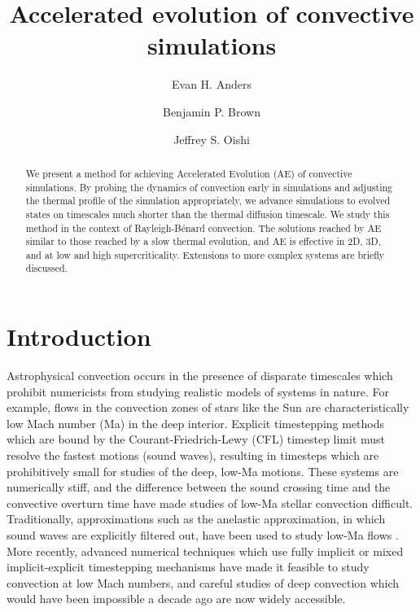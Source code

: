 \documentclass[aps, pre, onecolumn, nofootinbib, notitlepage, groupedaddress, amsfonts, amssymb, amsmath, longbibliography]{revtex4-1}
\newcommand{\RB}{Rayleigh-B\'{e}nard }
\begin{document}
\author{Evan H. Anders}
\author{Benjamin P. Brown}
\author{Jeffrey S. Oishi}
\title{Accelerated evolution of convective simulations}

\begin{abstract}
We present a method for achieving Accelerated Evolution (AE) of convective simulations.
By probing the dynamics of convection early in simulations and adjusting the
thermal profile of the simulation appropriately, we advance simulations to
evolved states on timescales much shorter than the thermal diffusion timescale.
We study this method in the context of \RB convection. 
The solutions reached by AE similar to those reached by a slow thermal evolution, 
and AE is effective in 2D, 3D, and at low and high supercriticality.  
Extensions to more complex systems are briefly discussed.
\end{abstract}
\maketitle


\section{Introduction}
\label{sec:intro}
Astrophysical convection occurs in the presence of disparate timescales which
prohibit numericists from studying realistic models of systems in nature.  For example,
flows in the convection zones of stars like the Sun are characteristically low Mach number
(Ma) in the deep interior.
Explicit timestepping methods which are bound by the Courant-Friedrich-Lewy
(CFL) timestep limit must resolve the fastest motions (sound
waves), resulting in timesteps which are prohibitively
small for studies of the deep, low-Ma motions. These systems are numerically
stiff, and the difference between
the sound crossing time and the convective overturn time have made studies of low-Ma stellar
convection difficult. Traditionally, approximations such as
the anelastic approximation, in which sound waves are explicitly filtered out,
have been used to study low-Ma flows \cite{brown&all2010, featherstone&hindman2016}.
More recently, advanced numerical techniques which use fully implicit 
\cite{viallet&all2011, viallet&all2013, viallet&all2016} or mixed
implicit-explicit \cite{lecoanet&all2014, anders&brown2017, bordwell&all2018} 
timestepping mechanisms have made it feasible to study
convection at low Mach numbers, and careful studies of deep convection which
would have been impossible a decade ago are now widely accessible.
\end{document}
